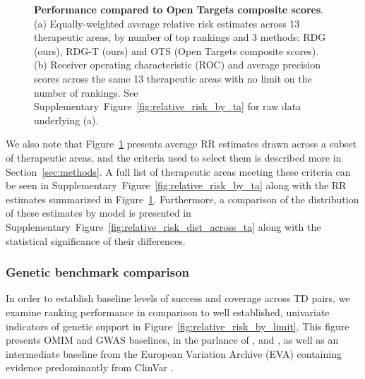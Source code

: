 \documentclass{article}
\begin{document}
\begin{figure}[!htb]
  \centering
  \captionsetup{width=.9\linewidth}
  \captionsetup[subfigure]{labelformat=empty}
  \qquad
  \caption{
    \textbf{Performance compared to Open Targets composite scores}.
    (a) Equally-weighted average relative risk estimates across 13 therapeutic areas, by number of top rankings and 3 methods: RDG (ours), RDG-T (ours) and OTS (Open Targets composite scores). 
    (b) Receiver operating characteristic (ROC) and average precision scores across the same 13 therapeutic areas with no limit on the number of rankings. 
    See Supplementary~Figure~\ref{fig:relative_risk_by_ta} for raw data underlying (a).
  }
  \label{fig:performance_across_ta}
\end{figure}

We also note that Figure~\ref{fig:performance_across_ta} presents average RR estimates drawn across a subset of therapeutic areas, and the criteria used to select them is described more in Section~\ref{sec:methods}. A full list of therapeutic areas meeting these criteria can be seen in Supplementary~Figure~\ref{fig:relative_risk_by_ta} along with the RR estimates summarized in Figure~\ref{fig:performance_across_ta}. Furthermore, a comparison of the distribution of these estimates by model is presented in Supplementary~Figure~\ref{fig:relative_risk_dist_across_ta} along with the statistical significance of their differences.

\subsubsection{Genetic benchmark comparison}

In order to establish baseline levels of success and coverage across TD pairs, we examine ranking performance in comparison to well established, univariate indicators of genetic support in Figure~\ref{fig:relative_risk_by_limit}. This figure presents OMIM and GWAS baselines, in the parlance of \cite{King2019-rc}, \cite{Nelson2015-eg} and \cite{Minikel2023.06.23.23291765}, as well as an intermediate baseline from the European Variation Archive (EVA) \cite{PMID:34718739} containing evidence predominantly from ClinVar \cite{PMID:24234437}.
\end{document}

